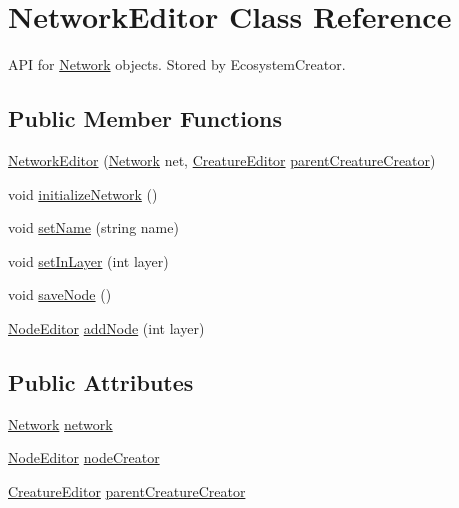 \hypertarget{class_network_editor}{}\section{Network\+Editor Class Reference}
\label{class_network_editor}


A\+PI for \mbox{\hyperlink{class_network}{Network}} objects. Stored by Ecosystem\+Creator.  


\subsection*{Public Member Functions}
\begin{DoxyCompactItemize}
\item 
\mbox{\hyperlink{class_network_editor_a8e9b3df4a6b328ee2d42318a82160faa}{Network\+Editor}} (\mbox{\hyperlink{class_network}{Network}} net, \mbox{\hyperlink{class_creature_editor}{Creature\+Editor}} \mbox{\hyperlink{class_network_editor_ac21fdc9f2b2211e5c79e05658d65b119}{parent\+Creature\+Creator}})
\item 
void \mbox{\hyperlink{class_network_editor_ac6cb833b0655afc32cb87323b96cd18d}{initialize\+Network}} ()
\item 
void \mbox{\hyperlink{class_network_editor_a9424b0712de79d74664e75822a39baf7}{set\+Name}} (string name)
\item 
void \mbox{\hyperlink{class_network_editor_aa0b9ca558f67b306d9ebacd6b797f723}{set\+In\+Layer}} (int layer)
\item 
void \mbox{\hyperlink{class_network_editor_aa81908526dda169d2b29161460f9b0e2}{save\+Node}} ()
\item 
\mbox{\hyperlink{class_node_editor}{Node\+Editor}} \mbox{\hyperlink{class_network_editor_a3958da3c1d8c016ba28e6ffc44a7e35f}{add\+Node}} (int layer)
\end{DoxyCompactItemize}
\subsection*{Public Attributes}
\begin{DoxyCompactItemize}
\item 
\mbox{\hyperlink{class_network}{Network}} \mbox{\hyperlink{class_network_editor_ad7a7f511e42a332743dc2abb223ca2c4}{network}}
\item 
\mbox{\hyperlink{class_node_editor}{Node\+Editor}} \mbox{\hyperlink{class_network_editor_a877324ecefb6e6371a0572fc4a57b116}{node\+Creator}}
\item 
\mbox{\hyperlink{class_creature_editor}{Creature\+Editor}} \mbox{\hyperlink{class_network_editor_ac21fdc9f2b2211e5c79e05658d65b119}{parent\+Creature\+Creator}}
\end{DoxyCompactItemize}


